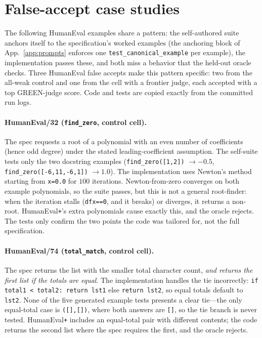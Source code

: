 \documentclass{article}
\begin{document}
\section{False-accept case studies}
\label{app:cases}

The following HumanEval examples share a pattern: the self-authored suite anchors itself to the
specification's worked examples (the anchoring block of App.~\ref{app:prompts} enforces one
\texttt{test\_canonical\_example} per example), the implementation passes these, and both miss
a behavior that the held-out oracle checks. Three HumanEval false accepts make this pattern
specific: two from the all-weak control and one from the cell with a frontier judge, each accepted
with a top GREEN-judge score. Code and tests are copied exactly from the committed run logs.

\paragraph{HumanEval/32 (\texttt{find\_zero}, control cell).} The spec requests a root of
a polynomial with an even number of coefficients (hence odd degree) under the stated
leading-coefficient assumption. The self-suite tests only the two docstring examples
(\texttt{find\_zero([1,2])} $\rightarrow -0.5$, \texttt{find\_zero([-6,11,-6,1])} $\rightarrow
1.0$). The implementation uses Newton's method starting from \texttt{x=0.0} for $100$
iterations. Newton-from-zero converges on both example polynomials, so the suite passes, but this
is not a general root-finder: when the iteration stalls (\texttt{dfx==0}, and it breaks) or
diverges, it returns a non-root. HumanEval\texttt{+}'s extra polynomials cause exactly
this, and the oracle rejects. The tests only confirm the two points the code was tailored for, not
the full specification.

\paragraph{HumanEval/74 (\texttt{total\_match}, control cell).} The spec returns the list with
the smaller total character count, \emph{and returns the first list if the totals are equal}.
The implementation handles the tie incorrectly: \texttt{if total1 < total2: return lst1} else
\texttt{return lst2}, so equal totals default to \texttt{lst2}. None of the five generated
example tests presents a clear tie---the only equal-total case is \texttt{([],[])}, where
both answers are \texttt{[]}, so the tie branch is never tested. HumanEval\texttt{+} includes
an equal-total pair with different contents; the code returns the second list where the spec
requires the first, and the oracle rejects.
\end{document}
